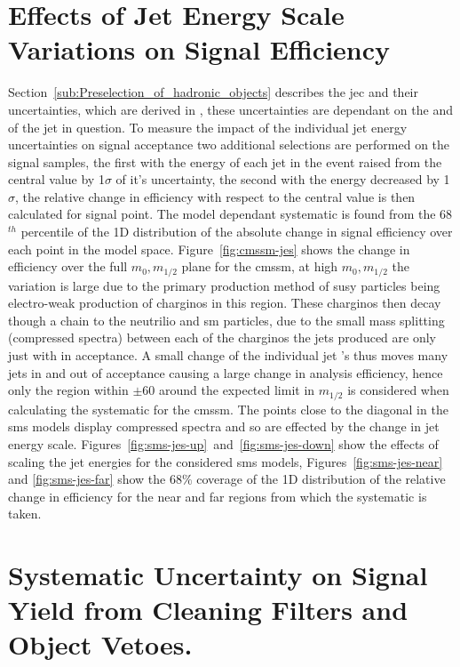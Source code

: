 \section{Effects of Jet Energy Scale Variations on Signal Efficiency} 
\label{sub:effects_of_jet_energy_scale_on_signal_efficiency}
Section~\ref{sub:Preselection_of_hadronic_objects} describes the \ac{jec} and their uncertainties, which are derived in \cite{Chatrchyan:2011ds}, these uncertainties are dependant on the \mETA and \ET of the jet in question. To measure the impact of the individual jet energy uncertainties on signal acceptance two additional selections are performed on the signal samples, the first with the energy of each jet in the event raised from the central value by 1$\sigma$ of it's uncertainty, the second with the energy decreased by 1$\sigma$, the relative change in efficiency with respect to the central value is then calculated for signal point. The model dependant systematic is found from the 68$^{th}$ percentile of the 1D distribution of the absolute change in signal efficiency over each point in the model space. Figure~\ref{fig:cmssm-jes} shows the change in efficiency over the full $m_{0}, m_{1/2}$ plane for the \ac{cmssm}, at high $m_{0}, m_{1/2}$ the variation is large due to the primary production method of 
\ac{susy} particles being electro-weak production of charginos in this region. 
These charginos then decay though a chain to the neutrilio and \ac{sm} 
particles, due to the small mass splitting (compressed spectra) between each of 
the charginos the jets produced are only just with in \ET acceptance. A small 
change of the individual jet \ET's thus moves many jets in and out of 
acceptance causing a large change in analysis efficiency, hence only the region 
within $\pm$\unit{60}{\GeV} around the expected limit in $m_{1/2}$ is 
considered when calculating the systematic for the \ac{cmssm}. The points close 
to the diagonal in the \ac{sms} models display compressed spectra and so are 
effected by the change in jet energy scale. 
Figures~\ref{fig:sms-jes-up}~and~\ref{fig:sms-jes-down} show the effects of 
scaling the jet energies for the considered \ac{sms} models, 
Figures~\ref{fig:sms-jes-near} and \ref{fig:sms-jes-far} show the 68$\%$ 
coverage of the 1D distribution of the relative change in efficiency for the 
near and far regions from which the systematic is taken.

\section{Systematic Uncertainty on Signal Yield from Cleaning Filters and Object Vetoes.} %
\label{sub:systematic_uncertainty_on_signal_yield_from_cleaning_filters_and_object_vetoes_}

